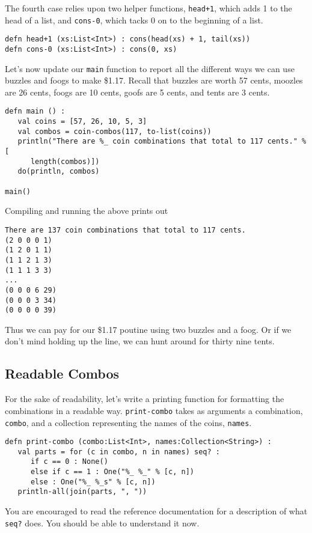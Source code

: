\documentclass[10pt,oneside]{book}
\begin{document}
The fourth case relies upon two helper functions, \texttt{\frenchspacing head+1}, which adds 1 to the head of a list, and \texttt{\frenchspacing cons-0}, which tacks 0 on to the beginning of a list. 
\begin{lstlisting}
defn head+1 (xs:List<Int>) : cons(head(xs) + 1, tail(xs))
defn cons-0 (xs:List<Int>) : cons(0, xs)
\end{lstlisting}

Let's now update our \texttt{\frenchspacing main} function to report all the different ways we can use buzzles and foogs to make \$1.17. Recall that buzzles are worth 57 cents, moozles are 26 cents, foogs are 10 cents, goofs are 5 cents, and tents are 3 cents.
\begin{lstlisting}
defn main () :
   val coins = [57, 26, 10, 5, 3]
   val combos = coin-combos(117, to-list(coins))
   println("There are %_ coin combinations that total to 117 cents." % [
      length(combos)])
   do(println, combos)

main()
\end{lstlisting}
Compiling and running the above prints out
\begin{lstlisting}
There are 137 coin combinations that total to 117 cents.
(2 0 0 0 1)
(1 2 0 1 1)
(1 1 2 1 3)
(1 1 1 3 3)
...
(0 0 0 6 29)
(0 0 0 3 34)
(0 0 0 0 39)
\end{lstlisting}
Thus we can pay for our \$1.17 poutine using two buzzles and a foog. Or if we don't mind holding up the line, we can hunt around for thirty nine tents. 

\subsection*{Readable Combos}
For the sake of readability, let's write a printing function for formatting the combinations in a readable way. \texttt{\frenchspacing print-combo} takes as arguments a combination, \texttt{\frenchspacing combo}, and a collection representing the names of the coins, \texttt{\frenchspacing names}. 
\begin{lstlisting}
defn print-combo (combo:List<Int>, names:Collection<String>) :
   val parts = for (c in combo, n in names) seq? :
      if c == 0 : None()
      else if c == 1 : One("%_ %_" % [c, n])
      else : One("%_ %_s" % [c, n])
   println-all(join(parts, ", "))   
\end{lstlisting}
You are encouraged to read the reference documentation for a description of what \texttt{\frenchspacing seq?} does. You should be able to understand it now.
\end{document}
